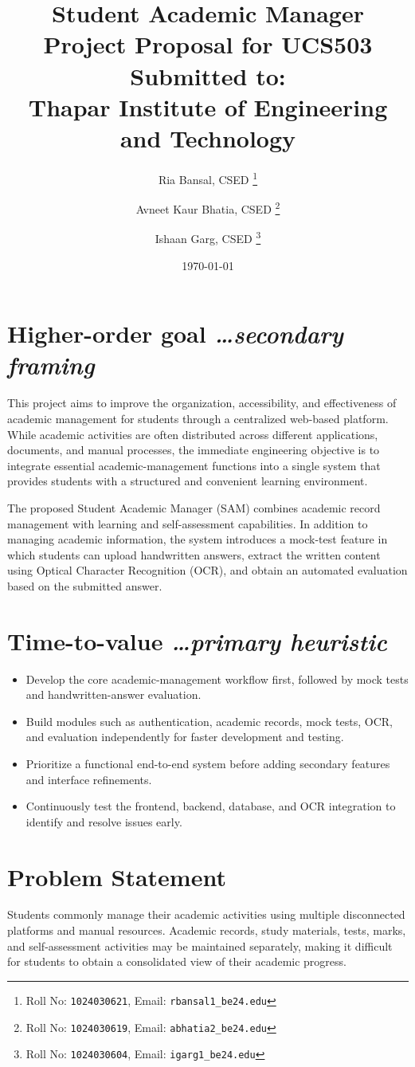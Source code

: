 \documentclass[11pt,a4paper]{article}
\title{
    \textbf{\Large Student Academic Manager}\\[0.5em]
    \large Project Proposal for UCS503\\
    Submitted to: \BvrLabInstructorValue\\
    \textbf{Thapar Institute of Engineering and Technology}
}
\author{
  Ria Bansal, CSED%
  \thanks{Roll No: \texttt{1024030621}, %
    Email: \texttt{rbansal1\_be24\@thapar.edu}}
  \and 
  Avneet Kaur Bhatia, CSED%
  \thanks{Roll No: \texttt{1024030619}, %
    Email: \texttt{abhatia2\_be24\@thapar.edu}}
    \and
    Ishaan Garg, CSED%
  \thanks{Roll No: \texttt{1024030604}, %
    Email: \texttt{igarg1\_be24\@thapar.edu}}
}
\date{\today}
\newcommand{\BvrHint}[1]{%
  {\normalfont\normalsize\itshape\hfill #1}}
\begin{document}
\maketitle

\section{Higher-order goal%
  \BvrHint{\ldots secondary framing}}
This project aims to improve the organization, accessibility, and effectiveness of academic management for students through a centralized web-based platform. While academic activities are often distributed across different applications, documents, and manual processes, the immediate engineering objective is to integrate essential academic-management functions into a single system that provides students with a structured and convenient learning environment.

The proposed Student Academic Manager (SAM) combines academic record management with learning and self-assessment capabilities. In addition to managing academic information, the system introduces a mock-test feature in which students can upload handwritten answers, extract the written content using Optical Character Recognition (OCR), and obtain an automated evaluation based on the submitted answer.

\section{Time-to-value %
\BvrHint{\ldots primary heuristic}}

\begin{itemize}
    \item Develop the core academic-management workflow first, followed by mock tests and handwritten-answer evaluation.

    \item Build modules such as authentication, academic records, mock tests, OCR, and evaluation independently for faster development and testing.

    \item Prioritize a functional end-to-end system before adding secondary features and interface refinements.

    \item Continuously test the frontend, backend, database, and OCR integration to identify and resolve issues early.
\end{itemize}

\section{Problem Statement}
Students commonly manage their academic activities using multiple disconnected platforms and manual resources. Academic records, study materials, tests, marks, and self-assessment activities may be maintained separately, making it difficult for students to obtain a consolidated view of their academic progress.
\end{document}

